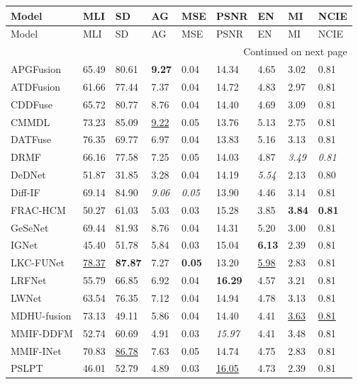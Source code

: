 {\small
\begin{longtable}{lllllllll}
\toprule
Model & MLI & SD & AG & MSE & PSNR & EN & MI & NCIE \\
\midrule
\endfirsthead
\toprule
Model & MLI & SD & AG & MSE & PSNR & EN & MI & NCIE \\
\midrule
\endhead
\midrule
\multicolumn{9}{r}{Continued on next page} \\
\midrule
\endfoot
\bottomrule
\endlastfoot
APGFusion & 65.49 & 80.61 & \textbf{9.27} & 0.04 & 14.34 & 4.65 & 3.02 & 0.81 \\
ATDFusion & 61.66 & 77.44 & 7.37 & 0.04 & 14.72 & 4.83 & 2.97 & 0.81 \\
CDDFuse & 65.72 & 80.77 & 8.76 & 0.04 & 14.40 & 4.69 & 3.09 & 0.81 \\
CMMDL & 73.23 & 85.09 & \underline{9.22} & 0.05 & 13.76 & 5.13 & 2.75 & 0.81 \\
DATFuse & 76.35 & 69.77 & 6.97 & 0.04 & 13.83 & 5.16 & 3.13 & 0.81 \\
DRMF & 66.16 & 77.58 & 7.25 & 0.05 & 14.03 & 4.87 & \textit{3.49} & \textit{0.81} \\
DeDNet & 51.87 & 31.85 & 3.28 & 0.04 & 14.19 & \textit{5.54} & 2.13 & 0.80 \\
Diff-IF & 69.14 & 84.90 & \textit{9.06} & \textit{0.05} & 13.90 & 4.46 & 3.14 & 0.81 \\
FRAC-HCM & 50.27 & 61.03 & 5.03 & 0.03 & 15.28 & 3.85 & \textbf{3.84} & \textbf{0.81} \\
GeSeNet & 69.44 & 81.93 & 8.76 & 0.04 & 14.31 & 5.20 & 3.00 & 0.81 \\
IGNet & 45.40 & 51.78 & 5.84 & 0.03 & 15.04 & \textbf{6.13} & 2.39 & 0.81 \\
LKC-FUNet & \underline{78.37} & \textbf{87.87} & 7.27 & \textbf{0.05} & 13.20 & \underline{5.98} & 2.83 & 0.81 \\
LRFNet & 55.79 & 66.85 & 6.92 & 0.04 & \textbf{16.29} & 4.57 & 3.21 & 0.81 \\
LWNet & 63.54 & 76.35 & 7.12 & 0.04 & 14.94 & 4.78 & 3.13 & 0.81 \\
MDHU-fusion & 73.13 & 49.11 & 5.86 & 0.04 & 14.40 & 4.41 & \underline{3.63} & \underline{0.81} \\
MMIF-DDFM & 52.74 & 60.69 & 4.91 & 0.03 & \textit{15.97} & 4.41 & 3.48 & 0.81 \\
MMIF-INet & 70.83 & \underline{86.78} & 7.63 & 0.05 & 14.74 & 4.75 & 2.83 & 0.81 \\
PSLPT & 46.01 & 52.79 & 4.89 & 0.03 & \underline{16.05} & 4.73 & 2.39 & 0.81 \\

\end{longtable}}
